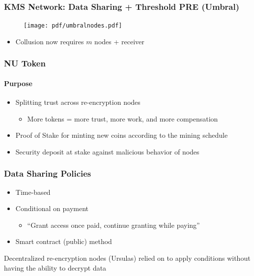 \documentclass[xetex,mathsans,sans,aspectratio=169]{beamer}
\begin{document}
    \begin{frame}
        \frametitle{KMS Network: Data Sharing + Threshold PRE (Umbral)}
        \begin{figure}
            \centering
            \texttt{[image: pdf/umbralnodes.pdf]}
        \end{figure}
        \begin{itemize}
            \item Collusion now requires $m$ nodes + receiver
        \end{itemize}
    \end{frame}

    \begin{frame}
        \frametitle{NU Token}
        \framesubtitle{Purpose}
        \begin{itemize}
            \setlength\itemsep{1em}
            \item Splitting trust across re-encryption nodes 
            \begin{itemize}
              \item More tokens = more trust, more work, and more compensation
            \end{itemize}
            \item Proof of Stake for minting new coins according to the mining schedule
            \item Security deposit at stake against malicious behavior of nodes
        \end{itemize}
    \end{frame}

   \begin{frame}
        \frametitle{Data Sharing Policies}
        \begin{itemize}
            \setlength\itemsep{1em}
            \item Time-based
            \item Conditional on payment 
            \begin{itemize}
              \item ``Grant access once paid, continue granting while paying''
            \end{itemize}
            \item Smart contract (public) method
        \end{itemize}
        \bigskip
        Decentralized re-encryption nodes (Ursulas) relied on to apply conditions without having the ability to decrypt data
    \end{frame}
\end{document}

